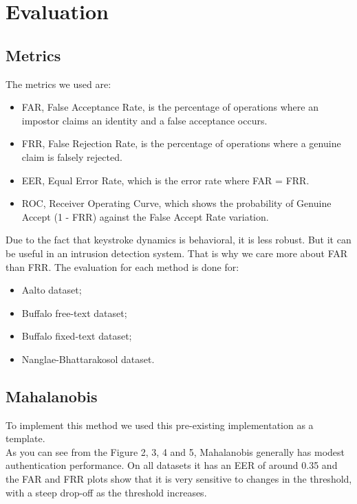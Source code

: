 \section{Evaluation}
\subsection{Metrics}
The metrics we used are:
\begin{itemize}
    \item FAR, False Acceptance Rate, is the percentage of operations where an impostor claims an identity and a false acceptance occurs.
    \item FRR, False Rejection Rate, is the percentage of operations where a genuine claim is falsely rejected.
    \item EER, Equal Error Rate, which is the error rate where FAR = FRR.
    \item ROC, Receiver Operating Curve, which shows the probability of Genuine Accept (1 - FRR) against the False Accept Rate variation.
\end{itemize}

Due to the fact that keystroke dynamics is behavioral, it is less robust. But it can be useful in an intrusion detection system. That is why we care more about FAR than FRR. The evaluation for each method is done for:

\begin{itemize}
    \item Aalto dataset;
    \item Buffalo free-text dataset;
    \item Buffalo fixed-text dataset;
    \item Nanglae-Bhattarakosol dataset.
\end{itemize}

\subsection{Mahalanobis}
\label{sec:mahalanobis}
To implement this method we used this pre-existing implementation \cite{ref:maha-code} as a template.\\

As you can see from the Figure 2, 3, 4 and 5, Mahalanobis generally has modest authentication performance. On all datasets it has an EER of around 0.35 and the FAR and FRR plots show that it is very sensitive to changes in the threshold, with a steep drop-off as the threshold increases.

